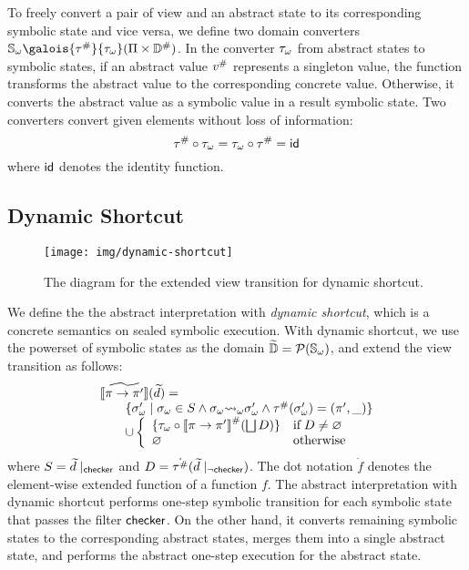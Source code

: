 To freely convert a pair of view and an abstract state to its corresponding
symbolic state and vice versa, we define two domain converters $\symbstset
\galois{\saconverter}{\asconverter} (\viewset \times \absdom)$.  In the
converter ${\tau}_\omega$ from abstract states to symbolic states, if an abstract
value ${v}^{\#}$ represents a singleton value, the function transforms the
abstract value to the corresponding concrete value.  Otherwise, it converts the
abstract value as a symbolic value in a result symbolic state.  Two converters
convert given elements without loss of information:
\[
  {\tau}^{\#} \circ {\tau}_\omega = {\tau}_\omega \circ {\tau}^{\#} = \textsf{id}
\]
where $\textsf{id}$ denotes the identity function.


\subsection{Dynamic Shortcut}

\begin{figure}[t]
  \centering
  \texttt{[image: img/dynamic-shortcut]}
  \vspace*{-2em}
  \caption{The diagram for the extended view transition for dynamic shortcut.}
  \vspace*{-1em}
  \label{fig:dynamic-shortcut}
\end{figure}

We define the the abstract interpretation with \textit{dynamic shortcut}, which
is a concrete semantics on sealed symbolic execution.  With dynamic shortcut,
we use the powerset of symbolic states as the domain $\widetilde{\mathbb{D}} =
\mathcal{P}({\mathbb{S}}_\omega)$, and extend the view transition as follows:
\[
  \begin{array}{l}
    [\![{\widetilde{\pi \rightarrow \pi'}}]\!](\widetilde{d}) =\\
    \qquad \{
      {\sigma}_\omega' \mid {\sigma}_\omega \in S \wedge
      {\sigma}_\omega {\leadsto}_\omega {\sigma}_\omega' \wedge
      {\tau}^{\#}({\sigma}_\omega') = (\pi', \_)
    \}\\
    \qquad \cup \left\{
    \begin{array}{ll}
      \{ {\tau}_\omega \circ {[\![{\pi\rightarrow \pi'}]\!]}^{\#}(\bigsqcup D) \}
      & \text{if} \; D \neq \varnothing\\
      \varnothing & \text{otherwise}\\
    \end{array}
    \right.
  \end{array}
\]
where $S = \widetilde{d}\mid_{\textsf{checker}}$ and $D =
\dot{{\tau}^{\#}}(\widetilde{d}\mid_{\neg\textsf{checker}})$.  The dot notation $\dot{f}$
denotes the element-wise extended function of a function $f$.  The abstract
interpretation with dynamic shortcut performs one-step symbolic transition for
each symbolic state that passes the filter $\textsf{checker}$. On the other hand, it
converts remaining symbolic states to the corresponding abstract states, merges
them into a single abstract state, and performs the abstract one-step execution
for the abstract state.

